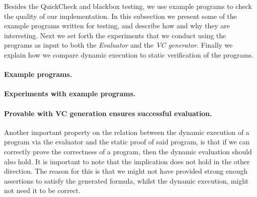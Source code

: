 Besides the QuickCheck and blackbox testing, we use example programs to check the quality of our implementation.
In this subsection we present some of the example programs written for testing, and describe how and why they are interesting.
Next we set forth the experiments that we conduct using the programs as input to both the \textit{Evaluator} and the \textit{VC generator}.
Finally we explain how we compare dynamic execution to static verification of the programs.

\paragraph{Example programs.}


\paragraph{Experiments with example programs.}


\paragraph{Provable with VC generation ensures successful evaluation.}
Another important property on the relation between the dynamic execution of a program via the evaluator and the static proof of said program, is that if we can correctly prove the correctness of a program, then the dynamic evaluation should also hold. It is important to note that the implication does not hold in the other direction. The reason for this is that we might not have provided strong enough assertions to satisfy the generated formula, whilst the dynamic execution, might not need it to be correct.

